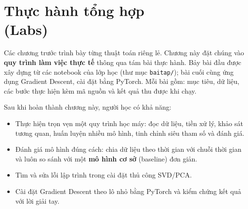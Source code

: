 
\chapter{Thực hành tổng hợp \\ (Labs)}
\label{chap:labs}

Các chương trước trình bày từng thuật toán riêng lẻ. Chương này đặt chúng vào \textbf{quy trình làm việc thực tế} thông qua tám bài thực hành. Bảy bài đầu được xây dựng từ các notebook của lớp học (thư mục \texttt{baitap/}); bài cuối cùng ứng dụng Gradient Descent, cài đặt bằng PyTorch. Mỗi bài gồm: mục tiêu, dữ liệu, các bước thực hiện kèm mã nguồn và kết quả thu được khi chạy.

\noindent Sau khi hoàn thành chương này, người học có khả năng:
\begin{itemize}
    \item Thực hiện trọn vẹn một quy trình học máy: đọc dữ liệu, tiền xử lý, khảo sát tương quan, huấn luyện nhiều mô hình, tinh chỉnh siêu tham số và đánh giá.
    \item Đánh giá mô hình đúng cách: chia dữ liệu theo thời gian với chuỗi thời gian và luôn so sánh với một \textbf{mô hình cơ sở} (baseline) đơn giản.
    \item Tìm và sửa lỗi lập trình trong cài đặt thủ công SVD/PCA.
    \item Cài đặt Gradient Descent theo lô nhỏ bằng PyTorch và kiểm chứng kết quả với lời giải tay.
\end{itemize}

